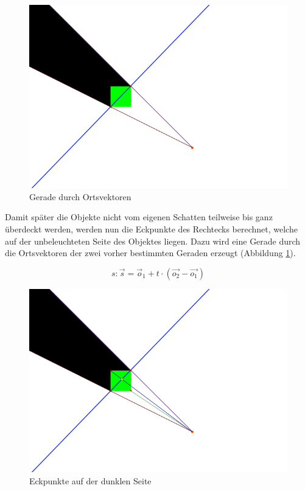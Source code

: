 \begin{figure}[t]
	\centering
	\includegraphics[width=\columnwidth]{images/durchfuehrung_2.png}
	\caption{Gerade durch Ortsvektoren}
	\label{fig:durch4}
\end{figure}

Damit später die Objekte nicht vom eigenen Schatten teilweise bis ganz überdeckt werden, werden nun die Eckpunkte des Rechtecks berechnet, welche auf der unbeleuchteten Seite des Objektes liegen. Dazu wird eine Gerade durch die Ortsvektoren der zwei vorher bestimmten Geraden erzeugt (Abbildung \ref{fig:durch4}).

\begin{equation}
	s: \vec{s} = \vec{o}_1 + t \cdot \left(\vec{o_2} - \vec{o_1}\right)
\end{equation}

\begin{figure}[t]
	\centering
	\includegraphics[width=\columnwidth]{images/durchfuehrung_3.png}
	\caption{Eckpunkte auf der dunklen Seite}
	\label{fig:durch5}
\end{figure}

